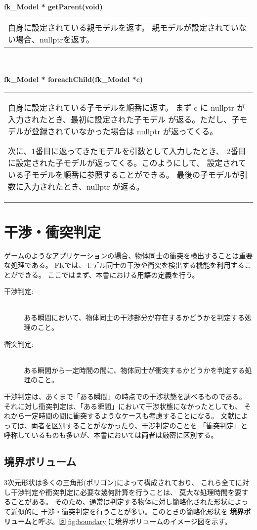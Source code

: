 \begin{tabbing}
\> \textbf{fk\_Model * getParent(void)} \\
	\> \> \begin{tabular}{p{15cm}}
		自身に設定されている親モデルを返す。
		親モデルが設定されていない場合、nullptrを返す。
	\end{tabular} \\ \\

\> \textbf{fk\_Model * foreachChild(fk\_Model *c)} \\
	\> \> \begin{tabular}{p{15cm}}
		自身に設定されている子モデルを順番に返す。
		まず c に nullptr が入力されたとき、最初に設定された子モデル
		が返る。ただし、子モデルが登録されていなかった場合は
		nullptr が返ってくる。

		次に、1番目に返ってきたモデルを引数として入力したとき、
		2番目に設定された子モデルが返ってくる。このようにして、
		設定されている子モデルを順番に参照することができる。
		最後の子モデルが引数に入力されたとき、nullptr が返る。
	\end{tabular}
\end{tabbing}

\section{干渉・衝突判定}
ゲームのようなアプリケーションの場合、物体同士の衝突を検出することは重要な処理である。
FKでは、モデル同士の干渉や衝突を検出する機能を利用することができる。
ここではまず、本書における用語の定義を行う。
\begin{description}
 \item[干渉判定:] ~ \\
	ある瞬間において、物体同士の干渉部分が存在するかどうかを判定する処理のこと。

 \item[衝突判定:] ~ \\
	ある瞬間から一定時間の間に、物体同士が衝突するかどうかを判定する処理のこと。
\end{description}

干渉判定は、あくまで「ある瞬間」の時点での干渉状態を調べるものである。
それに対し衝突判定は、「ある瞬間」において干渉状態になかったとしても、
それから一定時間の間に衝突するようなケースも考慮することになる。
文献によっては、両者を区別することがなかったり、干渉判定のことを
「衝突判定」と呼称しているものも多いが、本書においては両者は厳密に区別する。

\subsection{境界ボリューム}
3次元形状は多くの三角形(ポリゴン)によって構成されており、
これら全てに対し干渉判定や衝突判定に必要な幾何計算を行うことは、
莫大な処理時間を要することがある。
そのため、通常は判定する物体に対し簡略化された形状によって近似的に
干渉・衝突判定を行うことが多い。このときの簡略化形状を
\textbf{境界ボリューム}と呼ぶ。図\ref{fig:boundary}に境界ボリュームのイメージ図を示す。


